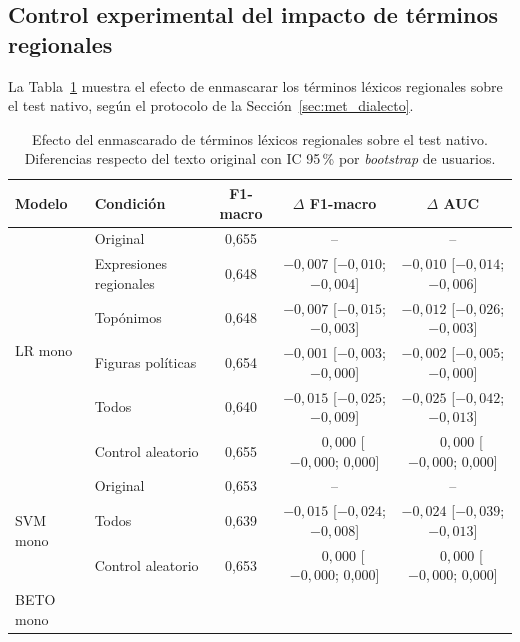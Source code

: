 \documentclass[12pt,a4paper]{article}
\begin{document}
\subsection{Control experimental del impacto de términos regionales}
\label{sec:control_dialectal}
La Tabla~\ref{tab:control_dialecto} muestra el efecto de enmascarar los términos léxicos regionales sobre el test nativo, según el protocolo de la Sección~\ref{sec:met_dialecto}.

\begin{table}[H]
\centering
\footnotesize
\setlength{\tabcolsep}{4pt}
\caption{Efecto del enmascarado de términos léxicos regionales sobre el test nativo. Diferencias respecto del texto original con IC 95\,\% por \emph{bootstrap} de usuarios.}
\label{tab:control_dialecto}
\begin{tabular}{llccc}
\toprule
\textbf{Modelo} & \textbf{Condición} & \textbf{F1-macro} & \textbf{$\Delta$ F1-macro} & \textbf{$\Delta$ AUC} \\
\midrule
\multirow{6}{*}{LR mono}
 & Original              & 0{,}655 & -- & -- \\
 & Expresiones regionales& 0{,}648 & $-0{,}007$ {\scriptsize [$-0{,}010$; $-0{,}004$]} & $-0{,}010$ {\scriptsize [$-0{,}014$; $-0{,}006$]} \\
 & Topónimos             & 0{,}648 & $-0{,}007$ {\scriptsize [$-0{,}015$; $-0{,}003$]} & $-0{,}012$ {\scriptsize [$-0{,}026$; $-0{,}003$]} \\
 & Figuras políticas     & 0{,}654 & $-0{,}001$ {\scriptsize [$-0{,}003$; $-0{,}000$]} & $-0{,}002$ {\scriptsize [$-0{,}005$; $-0{,}000$]} \\
 & Todos                 & 0{,}640 & $-0{,}015$ {\scriptsize [$-0{,}025$; $-0{,}009$]} & $-0{,}025$ {\scriptsize [$-0{,}042$; $-0{,}013$]} \\
 & Control aleatorio     & 0{,}655 & $\phantom{-}0{,}000$ {\scriptsize [$-0{,}000$; 0{,}000]} & $\phantom{-}0{,}000$ {\scriptsize [$-0{,}000$; 0{,}000]} \\
\midrule
\multirow{3}{*}{SVM mono}
 & Original              & 0{,}653 & -- & -- \\
 & Todos                 & 0{,}639 & $-0{,}015$ {\scriptsize [$-0{,}024$; $-0{,}008$]} & $-0{,}024$ {\scriptsize [$-0{,}039$; $-0{,}013$]} \\
 & Control aleatorio     & 0{,}653 & $\phantom{-}0{,}000$ {\scriptsize [$-0{,}000$; 0{,}000]} & $\phantom{-}0{,}000$ {\scriptsize [$-0{,}000$; 0{,}000]} \\
\midrule
\multirow{3}{*}{BETO mono}

\end{tabular}
\end{table}
\end{document}
